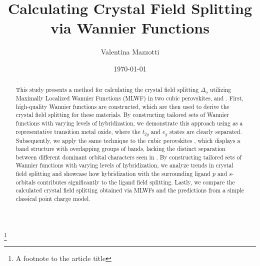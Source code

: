 \documentclass[%
 reprint,
 amsmath,amssymb,
 aps,
]{revtex4-2}
\begin{document}

\title{Calculating Crystal Field Splitting \\ via Wannier Functions}%
\thanks{A footnote to the article title}%

\author{Valentina Mazzotti}
\date{\today}%

\begin{abstract}

This study presents a method for calculating the crystal field splitting \(\Delta_{\text{o}}\) utilizing Maximally Localized Wannier Functions (MLWF) in two cubic perovskites,  and .  First, high-quality Wannier functions are constructed, which are then used to derive the crystal field splitting for these materials. By constructing tailored sets of Wannier functions with varying levels of hybridization, we demonstrate this approach using  as a representative transition metal oxide, where the \(t_{2g}\) and \(e_{g}\) states are clearly separated.  Subsequently, we apply the same technique to the cubic perovskites , which displays a band structure with overlapping groups of bands,  lacking the distinct separation between different dominant orbital characters seen in .
 By constructing tailored sets of Wannier functions with varying levels of hybridization, we analyze trends in crystal field splitting and showcase how hybridization with the surrounding ligand \(p\) and \(s\)-orbitals contributes significantly to the ligand field splitting. Lastly, we compare the calculated crystal field splitting obtained via MLWFs and the predictions from a simple classical point charge model. 

\end{abstract}

\maketitle
\end{document}
